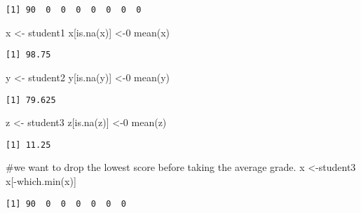 \documentclass[
  letterpaper,
  DIV=11,
  numbers=noendperiod]{scrartcl}
\newenvironment{Shaded}{\begin{snugshade}}{\end{snugshade}}
\newcommand{\CommentTok}[1]{\textcolor[rgb]{0.37,0.37,0.37}{#1}}
\newcommand{\DecValTok}[1]{\textcolor[rgb]{0.68,0.00,0.00}{#1}}
\newcommand{\FunctionTok}[1]{\textcolor[rgb]{0.28,0.35,0.67}{#1}}
\newcommand{\NormalTok}[1]{\textcolor[rgb]{0.00,0.23,0.31}{#1}}
\newcommand{\OtherTok}[1]{\textcolor[rgb]{0.00,0.23,0.31}{#1}}
\newcommand{\SpecialCharTok}[1]{\textcolor[rgb]{0.37,0.37,0.37}{#1}}
\begin{document}
\begin{verbatim}
[1] 90  0  0  0  0  0  0  0
\end{verbatim}

\begin{Shaded}
\begin{Highlighting}[]
\NormalTok{x }\OtherTok{\textless{}{-}}\NormalTok{ student1}
\NormalTok{x[}\FunctionTok{is.na}\NormalTok{(x)] }\OtherTok{\textless{}{-}}\DecValTok{0}
\FunctionTok{mean}\NormalTok{(x)}
\end{Highlighting}
\end{Shaded}

\begin{verbatim}
[1] 98.75
\end{verbatim}

\begin{Shaded}
\begin{Highlighting}[]
\NormalTok{y }\OtherTok{\textless{}{-}}\NormalTok{ student2}
\NormalTok{y[}\FunctionTok{is.na}\NormalTok{(y)] }\OtherTok{\textless{}{-}}\DecValTok{0}
\FunctionTok{mean}\NormalTok{(y)}
\end{Highlighting}
\end{Shaded}

\begin{verbatim}
[1] 79.625
\end{verbatim}

\begin{Shaded}
\begin{Highlighting}[]
\NormalTok{z }\OtherTok{\textless{}{-}}\NormalTok{ student3}
\NormalTok{z[}\FunctionTok{is.na}\NormalTok{(z)] }\OtherTok{\textless{}{-}}\DecValTok{0}
\FunctionTok{mean}\NormalTok{(z)}
\end{Highlighting}
\end{Shaded}

\begin{verbatim}
[1] 11.25
\end{verbatim}

\begin{Shaded}
\begin{Highlighting}[]
\CommentTok{\#we want to drop the lowest score before taking the average grade.}
\NormalTok{x }\OtherTok{\textless{}{-}}\NormalTok{student3}
\NormalTok{x[}\SpecialCharTok{{-}}\FunctionTok{which.min}\NormalTok{(x)]}
\end{Highlighting}
\end{Shaded}

\begin{verbatim}
[1] 90  0  0  0  0  0  0
\end{verbatim}
\end{document}
